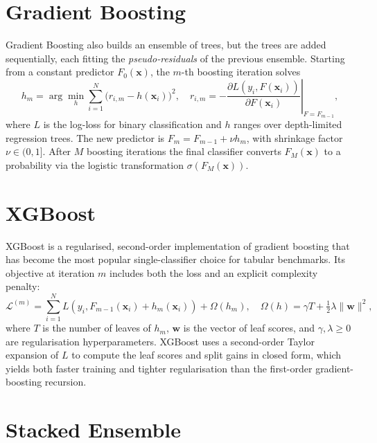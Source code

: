 \section{Gradient Boosting}
\label{sec:gb}

Gradient Boosting also builds an ensemble
of trees, but the trees are added sequentially, each fitting the
\emph{pseudo-residuals} of the previous ensemble. Starting from a
constant predictor $F_0(\mathbf{x})$, the $m$-th boosting iteration
solves
\begin{equation}
h_m
=
\arg\min_{h}
\sum_{i=1}^{N}
\bigl(
r_{i,m} - h(\mathbf{x}_i)
\bigr)^{2},
\quad
r_{i,m}
=
-\!\left.
\frac{\partial L(y_i,F(\mathbf{x}_i))}{\partial F(\mathbf{x}_i)}
\right|_{F=F_{m-1}},
\tag{2.9}
\label{eq:gb}
\end{equation}
where $L$ is the log-loss for binary classification and $h$ ranges
over depth-limited regression trees. The new predictor is
$F_m = F_{m-1} + \nu h_m$, with shrinkage factor $\nu\in(0,1]$.
After $M$ boosting iterations the final classifier converts
$F_M(\mathbf{x})$ to a probability via the logistic transformation
$\sigma(F_M(\mathbf{x}))$.

\section{XGBoost}
\label{sec:xgb}

XGBoost \citep{chen2016xgboost} is a regularised, second-order
implementation of gradient boosting that has become the most popular
single-classifier choice for tabular benchmarks. Its objective at
iteration $m$ includes both the loss and an explicit complexity
penalty:
\begin{equation}
\mathcal{L}^{(m)}
=
\sum_{i=1}^{N}
L\!\left(y_i,F_{m-1}(\mathbf{x}_i)+h_m(\mathbf{x}_i)\right)
+
\Omega(h_m),
\quad
\Omega(h)=\gamma T + \tfrac{1}{2}\lambda\lVert\mathbf{w}\rVert^{2},
\tag{2.10}
\label{eq:xgb}
\end{equation}
where $T$ is the number of leaves of $h_m$, $\mathbf{w}$ is the vector
of leaf scores, and $\gamma,\lambda\geq 0$ are regularisation
hyperparameters. XGBoost uses a second-order Taylor expansion of $L$
to compute the leaf scores and split gains in closed form, which
yields both faster training and tighter regularisation than the
first-order gradient-boosting recursion.

\section{Stacked Ensemble}
\label{sec:stacking}


